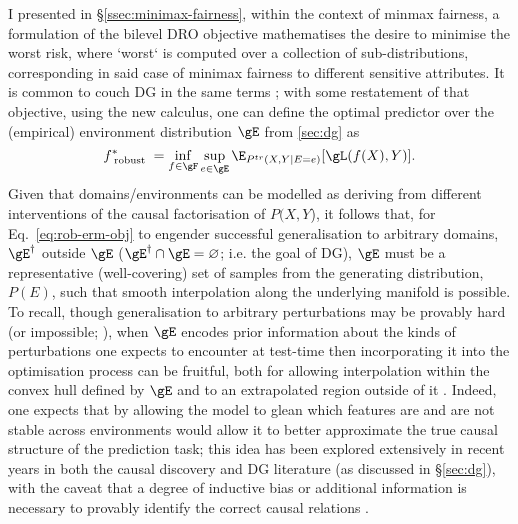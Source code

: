 I presented in \S\ref{ssec:minimax-fairness}, within the context of minmax fairness, a formulation
of the bilevel \ac{DRO} objective mathematises the desire to minimise the worst risk, where `worst`
is computed over a collection of sub-distributions, corresponding in said case of minimax fairness
to different sensitive attributes.
%
%
It is common to couch \ac{DG} in the same terms \citep{arjovsky2019invariant, krueger2021out,
sagawa2019distributionally}; with some restatement of that objective, using the new calculus, one
can define the optimal predictor over the (empirical) environment distribution \(\gE\) from
\ref{sec:dg} as
%
\begin{equation}\label{eq:rob-erm-obj} 
    f^\ast_\text{ robust } =
    \underset{ f \in \gF }{ \mathrm{inf} }\, 
    \underset{ e \in \gE}{ \mathrm{sup} }\,
    \E_{ P^{tr}( X, Y | E = e ) } [ \gL ( f( X ), Y ) ]. 
\end{equation}
%
Given that domains/environments can be modelled as deriving from different interventions of the
causal factorisation of \(P(X, Y\)), it follows that, for Eq.~\ref{eq:rob-erm-obj} to engender
successful generalisation to arbitrary domains, \(\gE^\dagger\) outside \(\gE\) (\( \gE^\dagger
\cap \gE = \varnothing \); i.e. the goal of \ac{DG}), \(\gE\) must be a representative
(well-covering) set of samples from the generating distribution, \( P(E) \), such that smooth
interpolation along the underlying manifold is possible.
%
%
To recall, though generalisation to arbitrary perturbations may be provably hard (or impossible;
\citealp{david2010impossibility}), when \(\gE\) encodes prior information about the kinds of
perturbations one expects to encounter at test-time then incorporating it into the optimisation
process can be fruitful, both for allowing interpolation within the convex hull defined by \(\gE\)
and to an extrapolated region outside of it \citep{krueger2021out}.
%
Indeed, one expects that by allowing the model to glean which features are and are not stable
across environments would allow it to better approximate the true causal structure of the
prediction task;
%
this idea has been explored extensively in recent years in both the causal discovery
\citep{peters2016causal, bengio2019meta} and \ac{DG} \citep{arjovsky2019invariant,
ahuja2020invariant, creager2021environment} literature (as discussed in \S\ref{sec:dg}), with the
caveat that a degree of inductive bias or additional information is necessary to provably identify
the correct causal relations \citep{lin2022zin}.
%

